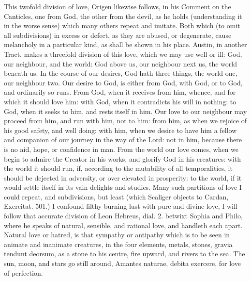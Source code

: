 {This twofold division of love, Origen likewise follows, in his Comment
on the Canticles, one from God, the other from the devil, as he holds
(understanding it in the worse sense) which many others repeat and
imitate. Both which (to omit all subdivisions) in excess or defect, as
they are abused, or degenerate, cause melancholy in a particular kind,
as shall be shown in his place. Austin, in another Tract, makes a
threefold division of this love, which we may use well or ill:
God, our neighbour, and the world: God above us, our neighbour
next us, the world beneath us. In the course of our desires, God hath
three things, the world one, our neighbour two. Our desire to God, is
either from God, with God, or to God, and ordinarily so runs. From God,
when it receives from him, whence, and for which it should love him:
with God, when it contradicts his will in nothing: to God, when it
seeks to him, and rests itself in him. Our love to our neighbour may
proceed from him, and run with him, not to him: from him, as when we
rejoice of his good safety, and well doing: with him, when we desire to
have him a fellow and companion of our journey in the way of the Lord:
not in him, because there is no aid, hope, or confidence in man. From
the world our love comes, when we begin to admire the Creator in his
works, and glorify God in his creatures: with the world it should run,
if, according to the mutability of all temporalities, it should be
dejected in adversity, or over elevated in prosperity: to the world, if
it would settle itself in its vain delights and studies. Many such
partitions of love I could repeat, and subdivisions, but least (which
Scaliger objects to Cardan, Exercitat. 501.) I confound filthy
burning lust with pure and divine love, I will follow that accurate
division of Leon Hebreus, dial. 2. betwixt Sophia and Philo, where he
speaks of natural, sensible, and rational love, and handleth each
apart. Natural love or hatred, is that sympathy or antipathy which is
to be seen in animate and inanimate creatures, in the four elements,
metals, stones, gravia tendunt deorsum, as a stone to his centre, fire
upward, and rivers to the sea. The sun, moon, and stars go still
around, Amantes naturae, debita exercere, for love of perfection.

}
